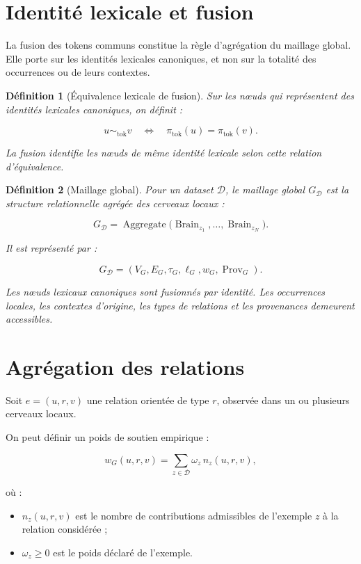 \documentclass[11pt,a4paper,oneside]{book}
\newtheorem{definition}{Définition}[chapter]
\theoremstyle{remark}
\DeclareMathOperator{\Brain}{Brain}
\newcommand{\Dataset}{\mathcal{D}}
\newcommand{\TokRel}{\sim_{\mathrm{tok}}}
\begin{document}
\section{Identité lexicale et fusion}

La fusion des tokens communs constitue la règle d'agrégation du
maillage global. Elle porte sur les identités lexicales canoniques,
et non sur la totalité des occurrences ou de leurs contextes.

\begin{definition}[Équivalence lexicale de fusion]
Sur les nœuds qui représentent des identités lexicales canoniques,
on définit :

\[
u\TokRel v
\quad\Longleftrightarrow\quad
\pi_{\mathrm{tok}}(u)=\pi_{\mathrm{tok}}(v).
\]

La fusion identifie les nœuds de même identité lexicale selon cette
relation d'équivalence.
\end{definition}

\begin{definition}[Maillage global]
Pour un dataset \(\Dataset\), le maillage global \(G_{\Dataset}\)
est la structure relationnelle agrégée des cerveaux locaux :

\[
G_{\Dataset}
=
\operatorname{Aggregate}
\bigl(
\Brain_{z_1},\ldots,\Brain_{z_N}
\bigr).
\]

Il est représenté par :

\[
G_{\Dataset}
=
(V_G,E_G,\tau_G,\ell_G,w_G,\operatorname{Prov}_G).
\]

Les nœuds lexicaux canoniques sont fusionnés par identité. Les
occurrences locales, les contextes d'origine, les types de relations
et les provenances demeurent accessibles.
\end{definition}

\section{Agrégation des relations}

Soit \(e=(u,r,v)\) une relation orientée de type \(r\), observée dans
un ou plusieurs cerveaux locaux.

On peut définir un poids de soutien empirique :

\[
w_G(u,r,v)
=
\sum_{z\in\Dataset}
\omega_z\,n_z(u,r,v),
\]

où :

\begin{itemize}
  \item \(n_z(u,r,v)\) est le nombre de contributions admissibles
        de l'exemple \(z\) à la relation considérée ;
  \item \(\omega_z\geq 0\) est le poids déclaré de l'exemple.
\end{itemize}
\end{document}
